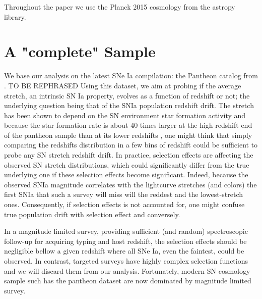 \documentclass[]{aa} %
\newcommand{\mr}[1]{{\textcolor[rgb]{0.60,0.10,0.6}{#1}}}
\begin{document}
Throughout the paper we use the Planck 2015 cosmology from the astropy library.

\section{A "complete" Sample}
\label{sec:sample}

We base our analysis on the latest SNe Ia compilation: the Pantheon catalog from
\cite{scolnic2018a}.  \mr{TO BE REPHRASED} Using this dataset, we aim at probing
if the average stretch, an intrinsic SN Ia property, evolves as a function of
redshift or not; the underlying question being that of the SNIa population
redshift drift.  The stretch has been shown to depend on the SN environment star
formation activity
\citep[e.g.][]{howell2007,sullivan2010,childress2013,rigault2013,rigault2018}
and because the star formation rate is about 40 times larger at the high
redshift end of the pantheon sample than at its lower redshifts
\citep[e.g.,][and references therein]{tasca2015}, one might think that simply
comparing the redshifts distribution in a few bins of redshift could be
sufficient to probe any SN stretch redshift drift.  In practice, selection
effects are affecting the observed SN stretch distributions, which could
significantly differ from the true underlying one if these selection effects
become significant. Indeed, because the observed SNIa magnitude correlates with
the lightcurve stretches (and colors) the first SNIa that such a survey will
miss will the reddest and the lowest-stretch ones. Consequently, if selection
effects is not accounted for, one might confuse true population drift with
selection effect and conversely.

In a magnitude limited survey, providing sufficient (and random) spectroscopic
follow-up for acquiring typing and host redshift, the selection effects should
be negligible bellow a given redshift where all SNe Ia, even the faintest, could
be observed.  In contrast, targeted surveys have highly complex selection
functions and we will discard them from our analysis. Fortunately, modern SN
cosmology sample such has the pantheon dataset are now dominated by magnitude
limited survey.
\end{document}
